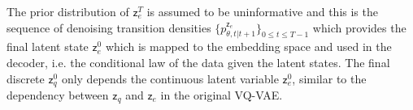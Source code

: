 \documentclass[nohyperref]{article}
\theoremstyle{plain}
\theoremstyle{definition}
\theoremstyle{remark}
\newcommand{\latentcont}{\mathsf{z}_e}
\newcommand{\latentdis}{\mathsf{z}_q}
\begin{document}
The prior distribution of  $\latentcont^T$ is assumed to be uninformative and this is the sequence of denoising transition densities $\{p^{\latentcont}_{\theta,t|t+1}\}_{0\leqslant t\leqslant T-1}$ which provides the final latent state $\latentcont^0$ which is mapped to the embedding space and used in the decoder, i.e. the conditional law of the data given the latent states. The final discrete $\latentdis^0$ only depends the continuous latent variable  $\latentcont^0$, similar to the dependency between $\latentdis$ and $\latentcont$ in the original VQ-VAE.

\end{document}
